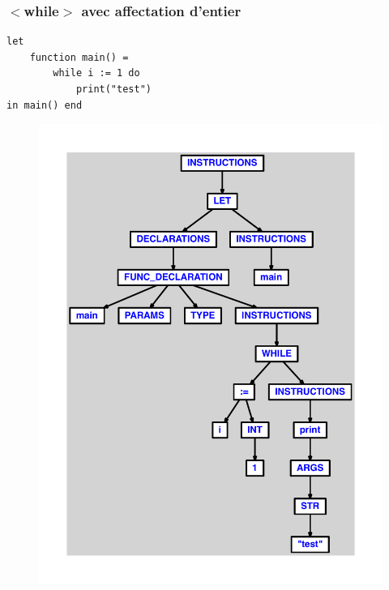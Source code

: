 \documentclass{article}
\begin{document}
\subsubsection{$ < $while$ > $ avec affectation d'entier}
\begin{lstlisting}
let
	function main() =
		while i := 1 do
			print("test")
in main() end
\end{lstlisting}
\newpage
\begin{figure}[H]
\centering
\includegraphics[max width=\textwidth]{ast/ast_323.pdf}
\end{figure}
\newpage
\end{document}
